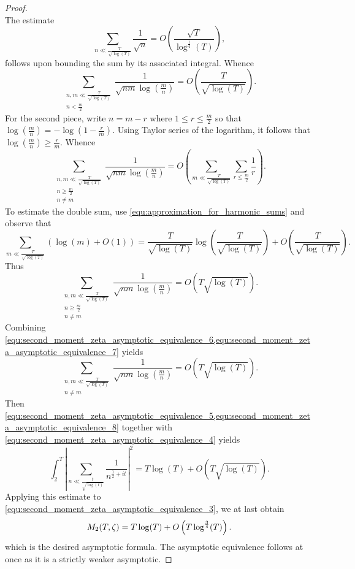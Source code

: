 \begin{proof}
\[      \]
      The estimate
      \[
        \sum_{n \ll \frac{T}{\sqrt{\log(T)}}}\frac{1}{\sqrt{n}} = O\left(\frac{\sqrt{T}}{\log^{\frac{1}{4}}(T)}\right),
      \]
      follows upon bounding the sum by its associated integral. Whence
      \begin{equation}\label{equ:second_moment_zeta_asymptotic_equivalence_6}
        \sum_{\substack{n,m \ll \frac{T}{\sqrt{\log(T)}} \\ n < \frac{m}{2}}}\frac{1}{\sqrt{nm}\log\left(\frac{m}{n}\right)} = O\left(\frac{T}{\sqrt{\log(T)}}\right).
      \end{equation}
      For the second piece, write \(n = m-r\) where \(1 \le r \le \frac{m}{2}\) so that \(\log\left(\frac{m}{n}\right) = -\log(1-\frac{r}{m})\). Using Taylor series of the logarithm, it follows that \(\log\left(\frac{m}{n}\right) \ge \frac{r}{m}\). Whence
      \[
        \sum_{\substack{n,m \ll \frac{T}{\sqrt{\log(T)}} \\ n \ge \frac{m}{2} \\ n \neq m}}\frac{1}{\sqrt{nm}\log\left(\frac{m}{n}\right)} = O\left(\sum_{m \ll \frac{T}{\sqrt{\log(T)}}}\sum_{r \le \frac{m}{2}}\frac{1}{r}\right).
      \]
      To estimate the double sum, use \cref{equ:approximation_for_harmonic_sums} and observe that
      \[
        \sum_{m \ll \frac{T}{\sqrt{\log(T)}}}\left(\log(m)+O(1)\right) = \frac{T}{\sqrt{\log(T)}}\log\left(\frac{T}{\sqrt{\log(T)}}\right)+O\left(\frac{T}{\sqrt{\log(T)}}\right).
      \]
      Thus
      \begin{equation}\label{equ:second_moment_zeta_asymptotic_equivalence_7}
        \sum_{\substack{n,m \ll \frac{T}{\sqrt{\log(T)}} \\ n \ge \frac{m}{2} \\ n \neq m}}\frac{1}{\sqrt{nm}\log\left(\frac{m}{n}\right)} = O\left(T\sqrt{\log(T)}\right).
      \end{equation}
      Combining \cref{equ:second_moment_zeta_asymptotic_equivalence_6,equ:second_moment_zeta_asymptotic_equivalence_7} yields
      \begin{equation}\label{equ:second_moment_zeta_asymptotic_equivalence_8}
        \sum_{\substack{n,m \ll \frac{T}{\sqrt{\log(T)}} \\ n \neq m}}\frac{1}{\sqrt{nm}\log\left(\frac{m}{n}\right)} = O\left(T\sqrt{\log(T)}\right).
      \end{equation}
      Then \cref{equ:second_moment_zeta_asymptotic_equivalence_5,equ:second_moment_zeta_asymptotic_equivalence_8} together with \cref{equ:second_moment_zeta_asymptotic_equivalence_4} yields
      \[
        \int_{2}^{T}\left|\sum_{n \ll \frac{t}{\sqrt{\log(t)}}}\frac{1}{n^{\frac{1}{2}+it}}\right|^{2} = T\log(T)+O\left(T\sqrt{\log(T)}\right).
      \]
      Applying this estimate to \cref{equ:second_moment_zeta_asymptotic_equivalence_3}, we at last obtain
      \[
        M_{2}(T,\zeta) = T\log(T)+O\left(T\log^{\frac{3}{4}}(T)\right).
      \]
      which is the desired asymptotic formula. The asymptotic equivalence follows at once as it is a strictly weaker asymptotic.
    \end{proof}
    
